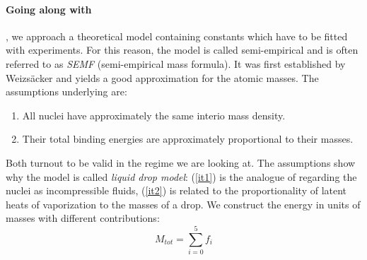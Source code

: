 \paragraph{Going along with}  
\cite{Hooshyar}, we approach a theoretical model containing constants which
have to be fitted with experiments. For this reason, the model is called semi-empirical and 
is often referred to as \emph{SEMF} (semi-empirical mass formula).
It was first established by Weizsäcker and yields a 
good approximation for the atomic masses. The assumptions underlying are:
\begin{enumerate}
    \item All nuclei have approximately the same interio mass density.
        \label{it1}
    \item Their total binding energies are approximately proportional to their masses.
        \label{it2}
\end{enumerate}
Both turnout to be valid in the regime we are looking at.
The assumptions show why the model is called \emph{liquid drop model}: 
(\ref{it1}) is the analogue of regarding the nuclei as incompressible fluids, 
(\ref{it2}) is related to the proportionality of latent heats of vaporization to the masses of a drop. 
We construct the energy in units of masses with different contributions:
\begin{equation}
    M_{tot} = \sum_{i=0}^{5} f_i 
\end{equation}
